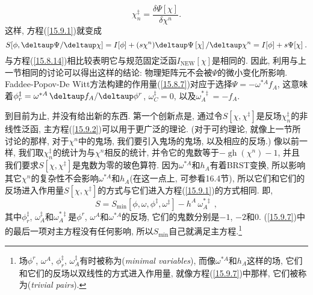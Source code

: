 \begin{equation}
\chi _{n}^{\ddag }=\frac{\delta \Psi [ \chi ]}{\delta \chi ^{n}}\text{
.}  \label{15.9.5}
\end{equation}%
这样, 方程(\ref{15.9.1})就变成\begin{equation}
S[\phi ,\deltaup \Psi /\deltaup \chi ]=I[\phi ]+(s\chi ^{n})\deltaup \Psi \left[
\chi \right] /\deltaup \chi ^{n}=I[\phi ]+s\Psi [ \chi ]\:. 
\label{15.9.6}
\end{equation}
与方程(\ref{15.8.14})相比较表明它与规范固定泛函$I_{\mathrm{NEW}}[\chi ]$是相同的. 因此,
利用与上一节相同的讨论可以得出这样的结论: 物理矩阵元不会被$\Psi $的微小变化所影响.
Faddee-Popov-De Witt方法构建的作用量(\ref{15.8.7})对应于选择$\Psi =-\omega ^{\ast A}f_{A}$, 这意味着$\phi _{r}^{\ddag }=\omega ^{\ast
A}\,\deltaup f_{A}/\deltaup \phi ^{r}$, $\omega _{C}^{\ddag }=0$, 以及$\omega _{A}^{\ast \ddag }=-f_{A}$.

到目前为止, 并没有给出新的东西. 第一个创新点是, 通过令$S[\chi ,\chi^{\ddag }]$是反场$\chi _{n}^{\ddag }$的非线性泛函, 
主方程(\ref{15.9.2})可以用于更广泛的理论. (对于可约理论, 就像上一节所讨论的那样,
对于$\chi ^{n}$中的鬼场, 我们要引入鬼场的鬼场, 以及相应的反场.) 像以前一样, 我们取$\chi _{n}^{\ddag }$的统计为与$\chi ^{n}$相反的统计, 
并令它的鬼数等于$-\operatorname{gh}(\chi ^{n})-1$, 并且我们要求$S[\chi,\chi ^{\ddag }]$是鬼数为零的玻色算符. 
因为$\omega ^{\ast A}$和$h_{A}$有着{}BRST变换, 所以影响其它$\chi ^{n}$的复杂性不会影响$\omega ^{\ast A}$和$h_{A}$(在这一点上, 
可参看16.4节), 所以它们和它们的反场进入作用量$S[\chi ,\chi^{\ddag }]$的方式与它们进入方程(\ref{15.9.1})的方式相同. 即,
\begin{equation}
S=S_{\min }[\phi ,\omega ,\phi ^{\ddag },\omega ^{\ddag }]-h^{A}\,\omega_{A}^{\ast \ddag }\:,   \label{15.9.7}
\end{equation}%
其中$\phi _{r}^{\ddag }$, $\omega _{A}^{\ddag }$和$\omega_{A}^{\ast \ddag }$是$\phi ^{r}$, $\omega ^{A}$和$\omega ^{\ast
A}$的反场, 它们的鬼数分别是$-1$, $-2$和$0$. (\ref{15.9.7})中的最后一项对主方程没有任何影响, 所以$S_{\min }$自己就满足主方程.\footnote{场$%
\phi ^{r}$, $\omega ^{A}$, $\phi _{r}^{\ddag }$, $\omega _{A}^{\ddag }$有时被称为{}(\textit{minimal variables}), 
而像$\omega ^{\ast A}$和$h_{A}$这样的场, 它们和它们的反场以双线性的方式进入作用量,
就像方程(\ref{15.9.7})中那样, 它们被称为{}(\textit{trivial pairs}).}

